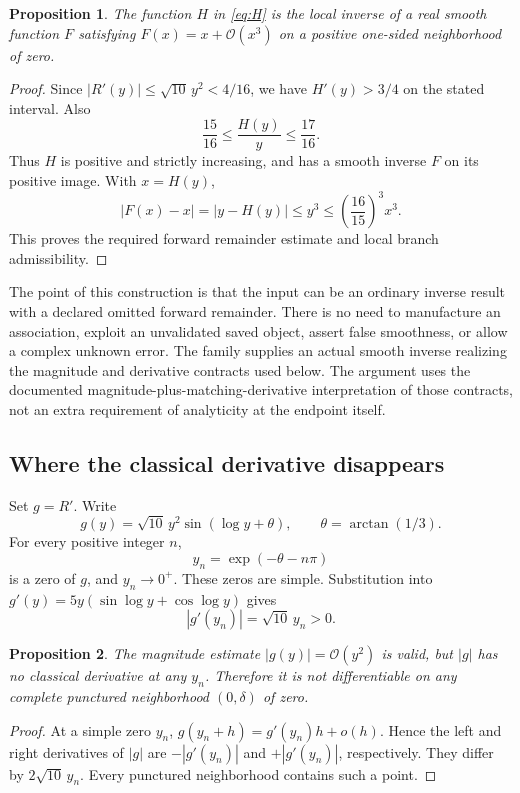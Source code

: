\documentclass[11pt,a4paper]{article}
\newcommand{\OO}{\mathcal O}
\newtheorem{proposition}{Proposition}[section]
\begin{document}
\begin{proposition}\label{prop:inverse-admissible}
The function $H$ in \eqref{eq:H} is the local inverse of a real smooth function
$F$ satisfying $F(x)=x+\OO(x^3)$ on a positive one-sided neighborhood of zero.
\end{proposition}
\begin{proof}
Since $|R'(y)|\le\sqrt{10}\,y^2<4/16$, we have $H'(y)>3/4$ on the stated
interval. Also
\[
 \frac{15}{16}\le\frac{H(y)}y\le\frac{17}{16}.
\]
Thus $H$ is positive and strictly increasing, and has a smooth inverse $F$ on
its positive image. With $x=H(y)$,
\[
 |F(x)-x|=|y-H(y)|\le y^3
 \le \left(\frac{16}{15}\right)^3 x^3.
\]
This proves the required forward remainder estimate and local branch
admissibility.
\end{proof}

The point of this construction is that the input can be an ordinary inverse
result with a declared omitted forward remainder. There is no need to manufacture
an association, exploit an unvalidated saved object, assert false smoothness,
or allow a complex unknown error. The family supplies an actual smooth inverse
realizing the magnitude and derivative contracts used below. The argument uses
the documented magnitude-plus-matching-derivative interpretation of those
contracts, not an extra requirement of analyticity at the endpoint itself.

\subsection{Where the classical derivative disappears}
Set $g=R'$. Write
\[
 g(y)=\sqrt{10}\,y^2\sin(\log y+\theta),\qquad
 \theta=\arctan(1/3).
\]
For every positive integer $n$,
\begin{equation}\label{eq:zeros}
 y_n=\exp(-\theta-n\pi)
\end{equation}
is a zero of $g$, and $y_n\to0^+$. These zeros are simple. Substitution into
$g'(y)=5y(\sin\log y+\cos\log y)$ gives
\begin{equation}\label{eq:slopes}
 |g'(y_n)|=\sqrt{10}\,y_n>0.
\end{equation}

\begin{proposition}\label{prop:cusp}
The magnitude estimate $|g(y)|=\OO(y^2)$ is valid, but $|g|$ has no classical
derivative at any $y_n$. Therefore it is not differentiable on any complete
punctured neighborhood $(0,\delta)$ of zero.
\end{proposition}
\begin{proof}
At a simple zero $y_n$,
$g(y_n+h)=g'(y_n)h+o(h)$. Hence the left and right derivatives of $|g|$ are
$-|g'(y_n)|$ and $+|g'(y_n)|$, respectively. They differ by
$2\sqrt{10}\,y_n$. Every punctured neighborhood contains such a point.
\end{proof}
\end{document}
